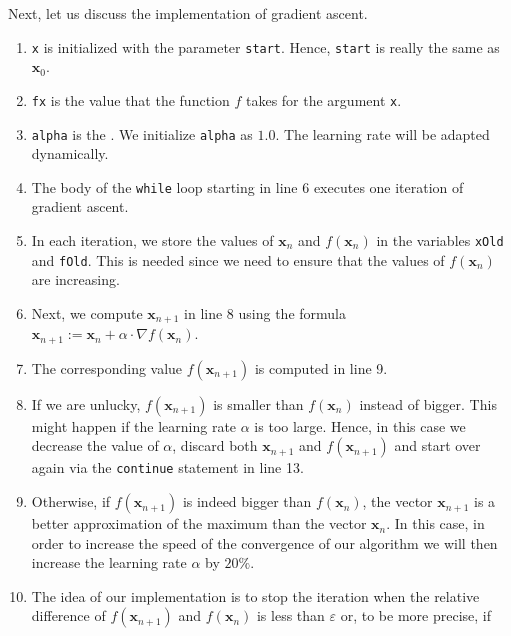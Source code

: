 Next, let us discuss the implementation of gradient ascent.
\begin{enumerate}
\item \texttt{x} is initialized with the parameter \texttt{start}.  Hence, \texttt{start} is really the same as
      $\mathbf{x}_0$. 
\item \texttt{fx} is the value that the function $f$ takes for the argument \texttt{x}.
\item \texttt{alpha} is the .  We initialize \texttt{alpha} as $1.0$.  The learning rate
      will be adapted dynamically. 
\item The body of the \texttt{while} loop starting in line 6 executes one iteration of gradient ascent.
\item In each iteration, we store the values of $\mathbf{x}_n$ and $f(\mathbf{x}_n)$ in the variables
      \texttt{xOld} and \texttt{fOld}.  This is needed since we need to ensure that the values of
      $f(\mathbf{x}_n)$ are increasing.
\item Next, we compute $\mathbf{x}_{n+1}$ in line 8 using the formula
      \\[0.2cm]
      \hspace*{1.3cm}
      $\mathbf{x}_{n+1} := \mathbf{x}_n + \alpha \cdot \nabla f(\mathbf{x}_n)$.
\item The corresponding value $f(\mathbf{x}_{n+1})$ is computed in line 9.
\item If we are unlucky, $f(\mathbf{x}_{n+1})$ is smaller than $f(\mathbf{x}_{n})$ instead of bigger.  This might happen if the learning
      rate $\alpha$ is too large.  Hence, in this case we decrease the value of $\alpha$, discard 
      both $\mathbf{x}_{n+1}$ and $f(\mathbf{x}_{n+1})$ and start over again via the \texttt{continue}
      statement in line 13.
\item Otherwise, if  $f(\mathbf{x}_{n+1})$ is indeed bigger than $f(\mathbf{x}_{n})$, the vector
  $\mathbf{x}_{n+1}$ is a better approximation of the maximum than the vector $\mathbf{x}_n$.  
      In this case, in order to increase the speed of the convergence of our algorithm we will then increase the learning rate
      $\alpha$ by $20\%$.    
\item The idea of our implementation is to stop the iteration when the relative difference  of 
      $f(\mathbf{x}_{n+1})$ and $f(\mathbf{x}_{n})$ is less than $\varepsilon$ or, to be more precise, if
      \\[0.2cm]
      \hspace*{1.3cm}

\end{enumerate}
